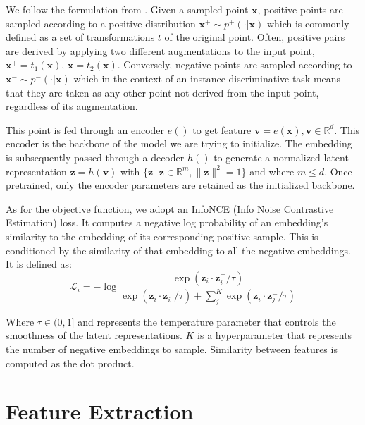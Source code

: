 \documentclass[10pt,twocolumn,letterpaper]{article}
\begin{document}
We follow the formulation from \cite{le-khac_contrastive_2020}. Given a sampled point $\mathbf{x}$, positive points are sampled according to a positive distribution $\mathbf{x}^{+} \sim p^{+}( \cdot | \mathbf{x})$ which is commonly defined as a set of transformations $t$ of the original point. Often, positive pairs are derived by applying two different augmentations to the input point, $\mathbf{x}^{+} = t_{1}(\mathbf{x}), \, \mathbf{x} = t_{2}(\mathbf{x})$. Conversely, negative points are sampled according to $\mathbf{x}^{-} \sim p^{-}( \cdot | \mathbf{x})$ which in the context of an instance discriminative task means that they are taken as any other point not derived from the input point, regardless of its augmentation.

This point is fed through an encoder $e()$ to get feature $\mathbf{v} = e(\mathbf{x}), \mathbf{v} \in \mathbb{R}^d$. This encoder is the backbone of the model we are trying to initialize. The embedding is subsequently passed through a decoder $h()$ to generate a normalized latent representation $\mathbf{z}=h(\mathbf{v})$ with $\{\mathbf{z} \, | \, \mathbf{z} \in \mathbb{R}^{m}, \lVert \mathbf{z} \lVert^{2} = 1\}$  and where $m \leq d$. Once pretrained, only the encoder parameters are retained as the initialized backbone.

As for the objective function, we adopt an InfoNCE (Info Noise Contrastive Estimation) loss. It computes a negative log probability of an embedding's similarity to the embedding of its corresponding positive sample. This is conditioned by the similarity of that embedding to all the negative embeddings. It is defined as:
\begin{equation}
    \mathcal{L}_{i} = -\log \frac{\exp(\mathbf{z}_{i} \cdot \mathbf{z}^{+}_{i} / \tau)}{\exp(\mathbf{z}_{i} \cdot \mathbf{z}^{+}_{i} / \tau) + \sum^{K}_{j}\exp(\mathbf{z}_{i} \cdot \mathbf{z}^{-}_{j} / \tau)}
    \label{eq:contrastive_loss}
\end{equation}

Where $\tau \in (0,1]$ and represents the temperature parameter that controls the smoothness of the latent representations. $K$ is a hyperparameter that represents the number of negative embeddings to sample. Similarity between features is computed as the dot product.

\section{Feature Extraction}
\label{sec:featureExtraction}
\end{document}
